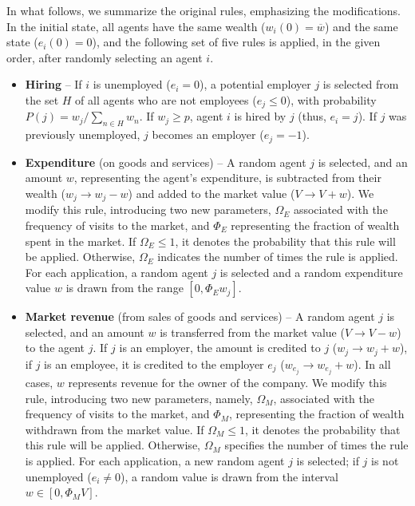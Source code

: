 \documentclass[12pt,preprint]{revtex4-1}
\begin{document}
In what follows, we summarize the original rules, emphasizing the modifications. In the initial state, all agents have the same wealth ($w_i(0)=\overline{w}$) and the same state ($e_i(0)=0$), and the following set of five rules is applied, in the given order, after randomly selecting an agent $i$.
  

\begin{itemize}

\item  {\bf Hiring} -- If $i$ is unemployed ($e_i=0$), a potential employer $j$ is selected from the set $H$  of all agents who are not employees ($e_j \leq 0$), with  probability  $P (j)= w_{j}/\sum_{n\in H}w_{n}$.   If $ w_j \ge p$, agent $i$ is hired by $j$ (thus, $e_i=j$).    If $j$ was previously unemployed, $j$ becomes an employer ($e_j=-1$).

\item   {\bf  Expenditure} (on goods and services) -- A random agent $j$ is selected, and an amount $w$, representing the agent's expenditure, is subtracted from their wealth ($w_j \to w_j-w$) and added to the market value ($V \to V+w$).
We modify this rule, introducing two new parameters,  $\Omega_E$ associated with the frequency of visits to the market, and $\Phi_E$ representing the fraction of wealth spent in the market.
%
If $\Omega_E\leq1$, it denotes the probability that this rule will be applied.  
Otherwise, $\Omega_E$ indicates the number of times the rule is applied. 
For each application, a random agent $j$ is selected and a random expenditure value $w$ is drawn from the range $\left[0,\Phi_E w_j\right]$. 
 
\item {\bf Market revenue} (from sales of goods and services) -- 
A random agent $j$ is selected, and an amount $w$ is  transferred from the market value ($V \to V - w$) to the agent $j$.  If $j$ is an employer, the amount is credited to $j$ ($w_j \to w_j + w$), if $j$ is an employee, it is credited to the employer $e_j$  ($w_{e_j} \to w_{e_j} + w$).  In all cases,  $w$ represents revenue for the owner of the company.
We modify this rule, introducing two new parameters, namely,  $\Omega_M$, associated with the frequency of visits to the market, and $\Phi_M$, representing the fraction of wealth withdrawn from the market value.
%
If $\Omega_M\leq1$, it denotes the probability that this rule will be applied.
Otherwise, $\Omega_M$ specifies the number of times the rule is applied.  For each application, a new random agent $j$ is selected; if $j$  is not unemployed ($e_i\neq 0$), a random value is drawn from the interval $w \in [0, \Phi_M V]$.


\end{itemize}
\end{document}
